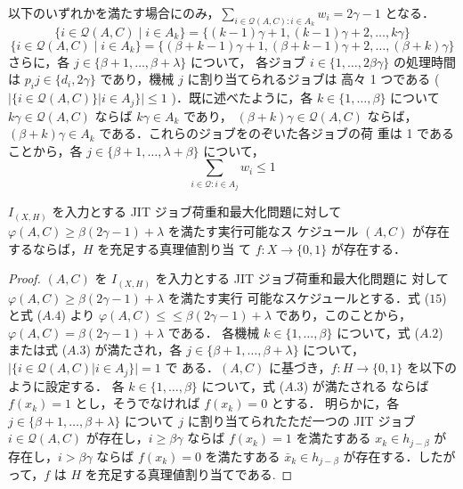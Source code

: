 \documentclass[12pt]{optlab-bachelor}
\begin{document}
以下のいずれかを満たす場合にのみ，$\displaystyle \sum_{i \in \mathcal{Q}(A,C):i \in A_k}w_i = 2\gamma - 1$ となる．
\begin{equation}
  \{i \in \mathcal{Q}(A,C) \mid i \in A_k\} = \{(k - 1)\gamma + 1, (k
  - 1)\gamma + 2,\ldots,k\gamma\} \tag{A.2}
\end{equation}
\begin{equation}
  \{i \in \mathcal{Q}(A,C) \mid i \in A_k\} = \{(\beta + k -
  1)\gamma + 1, (\beta + k
  - 1)\gamma + 2,\ldots,(\beta + k)\gamma\} \tag{A.3}
\end{equation}
さらに，各 $j \in \{\beta + 1,\ldots, \beta + \lambda \}$ について，
各ジョブ $i \in \{1,\ldots, 2\beta \gamma \}$ の処理時間は $p_ij
\in \{d_i, 2\gamma \}$ であり，機械 $j$ に割り当てられるジョブは
高々 1 つである ( $|\{i \in \mathcal{Q}(A, C)\} | i \in A_j \}| \le 1$
)．既に述べたように，各 $k \in \{1,\ldots,\beta \}$ について
$k\gamma \in \mathcal{Q}(A,C)$ ならば $k\gamma \in A_k$ であり，
$(\beta + k) \gamma \in \mathcal{Q}(A,C)$ ならば，$(\beta +
k)\gamma \in A_k$ である．これらのジョブをのぞいた各ジョブの荷
重は 1 であることから，各 $j \in \{ \beta + 1,\ldots,
\lambda + \beta \}$ について，
\begin{equation}
  \displaystyle \sum_{i \in \mathcal{Q}:i \in A_j}w_i \le 1 \tag{A.4}
\end{equation}

\begin{lemma}\label{l_2}
  $I_{(X,H)}$ を入力とする JIT ジョブ荷重和最大化問題に対して
  $\varphi(A, C) \ge \beta(2\gamma − 1) + \lambda$ を満たす実行可能なス
  ケジュール $(A, C)$ が存在するならば，$H$ を充足する真理値割り当
  て $f : X \to \{0, 1\}$ が存在する．
\end{lemma}

\begin{proof}
  $(A, C)$ を $I_{(X,H)}$ を入力とする JIT ジョブ荷重和最大化問題に
  対して $\varphi(A, C) \ge \beta (2\gamma − 1) + \lambda$ を満たす実行
  可能なスケジュールとする．式 ($15$) と式 ($A.4$) より $\varphi(A, C
  )\le≤ \beta(2\gamma − 1) + \lambda$ であり，このことから，
  $\varphi(A, C) = \beta (2\gamma − 1) + \lambda$ である．
  各機械 $k \in \{1,\ldots, \beta\}$ について，式 ($A.2$) または式
  ($A.3$) が満たされ，各 $j \in \{ \beta + 1,\ldots,\beta + \lambda
  \}$ について，$|\{ i \in \mathcal{Q}(A,C) | i \in A_j \} | = 1$ で
  ある．$(A,C)$ に基づき，$f : H \to \{0,1\}$ を以下のように設定する．
  各 $k \in \{1,\ldots, \beta \}$ について，式 ($A.3$) が満たされる
  ならば $f(x_k) = 1$ とし，そうでなければ $f(x_k) = 0$ とする．
  明らかに，各 $j \in \{\beta + 1,\ldots,\beta + \lambda \}$ について
  $j$ に割り当てられたただ一つの JIT ジョブ $i \in
  \mathcal{Q}(A,C)$ が存在し，$i \ge \beta \gamma$ ならば $f(x_k)
  = 1$ を満たすある $x_k \in h_{j - \beta}$ が存在し，$i > \beta
  \gamma$ ならば $f(x_k) = 0$ を満たすある $\bar x_k \in h_{j -
  \beta}$ が存在する．したがって，$f$ は $H$ を充足する真理値割り当てである.
\end{proof}
\end{document}
